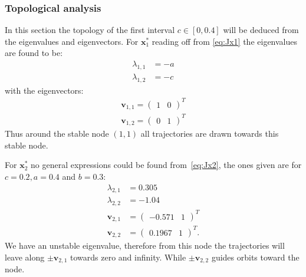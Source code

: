 \subsubsection{Topological analysis}
In this section the topology of the first interval $c \in [0,0.4]$ will be deduced from the eigenvalues and eigenvectors. For $\mathbf{x}_1^*$ reading off from \ref{eq:Jx1} the eigenvalues are found to be:
\begin{align}
 \lambda_{1,1} &=  -a \\
 \lambda_{1,2} &=  -c
\end{align}
with the eigenvectors:
\begin{align}
\mathbf{v}_{1,1} = \begin{pmatrix} 1 & 0 \end{pmatrix}^T \\
\mathbf{v}_{1,2} = \begin{pmatrix} 0 & 1 \end{pmatrix}^T
\end{align}
Thus around the stable node $(1,1)$ all trajectories are drawn towards this stable node.

For $\mathbf{x}_2^*$ no general expressions could be found from~\ref{eq:Jx2}, the ones given are for $c = 0.2, a = 0.4$ and $b = 0.3$:
\begin{align}
\lambda_{2,1} &= 0.305\\
\lambda_{2,2} &= -1.04 \\
\mathbf{v}_{2,1} &= \begin{pmatrix} -0.571 & 1 \end{pmatrix}^T \\
\mathbf{v}_{2,2} &= \begin{pmatrix} 0.1967 & 1 \end{pmatrix}^T.
\end{align}
We have an unstable eigenvalue, therefore from this node the trajectories will leave along $\pm \mathbf{v}_{2,1}$ towards zero and infinity. While $\pm \mathbf{v}_{2,2}$ guides orbits toward the node. 

